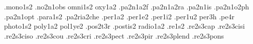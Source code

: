 {.mono1s2                                                                        
.no2n1obs                                                                       
omni1s2                                                                         
oxy1a2                                                                          
.pa2n1a2f                                                                       
.pa2n1a2ra                                                                      
.pa2n1is                                                                        
.pa2n1o2ph                                                                      
.pa2n1opt                                                                       
.para1s2                                                                        
.pa2ria2che                                                                     
.per1a2                                                                         
.per1e2                                                                         
.per1i2                                                                         
.per1u2                                                                         
per3h                                                                           
.pe4r                                                                           
photo1s2                                                                        
poly1a2                                                                         
pol1ye2                                                                         
.pos2t3r                                                                        
.postis2                                                                        
radio1a2                                                                        
.re1s2                                                                          
.re2s3cap                                                                       
.re2s3cisi                                                                      
.re2s3ciso                                                                      
.re2s3cou                                                                       
.re2s3cri                                                                       
.re2s3pect                                                                      
.re2s3pir                                                                       
.re2s3plend                                                                     
.re2s3pons                                                                      
}
